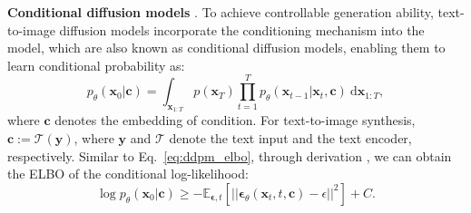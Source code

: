 \textbf{Conditional diffusion models} \cite{ho2022classifier, nichol2021glide, rombach2022high}.
To achieve controllable generation ability, text-to-image diffusion models
incorporate the conditioning mechanism into the model, which are also known as conditional diffusion models, enabling them to learn conditional  probability as:
\begin{equation}
p_\theta(\mathbf{x}_0 |\mathbf{c}) = \int_{\mathbf{x}_{1:T}} p(\mathbf{x}_T) \prod_{t=1}^T p_\theta(\mathbf{x}_{t-1} | \mathbf{x}_t, \mathbf{c})\  \mathrm{d}\mathbf{x}_{1:T},
\end{equation}
where $\mathbf{c}$ denotes the embedding of condition. For text-to-image synthesis, $\mathbf{c}:=\mathcal{T}(\mathbf{y})$, where  $\mathbf{y}$ and $\mathcal{T}$ denote the text input and the text encoder, respectively.
Similar to Eq.~\eqref{eq:ddpm_elbo}, through derivation \cite{li2023your}, we can obtain the ELBO of the conditional log-likelihood:
\begin{equation}\label{eq:cdm_elbo}
   \log p_\theta(\mathbf{x}_0 |\mathbf{c}) 
   \geq
   - \mathbb{E}_{ \mathbf{\epsilon}, t} \left[|| \mathbf{\epsilon}_{\theta}( \mathbf{x}_t    , t, \mathbf{c}) - \epsilon ||^2 \right] + C.
\end{equation}


